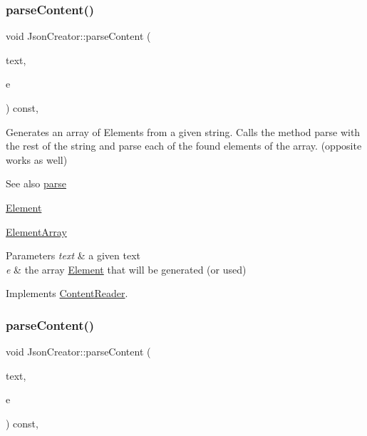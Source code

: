 \mbox{\label{classJsonCreator_a694669d359eb73890a9e9f247c4ebab4}} 
\subsubsection{\texorpdfstring{parse\+Content()}{parseContent()}\hspace{0.1cm}{\footnotesize\ttfamily [4/6]}}
{\footnotesize\ttfamily void Json\+Creator\+::parse\+Content (\begin{DoxyParamCaption}\item[{std\+::string \&}]{text,  }\item[{\mbox{\hyperlink{classElementArray}{Element\+Array}} $\ast$}]{e }\end{DoxyParamCaption}) const\hspace{0.3cm}{\ttfamily [override]}, {\ttfamily [virtual]}}

Generates an array of Elements from a given string. Calls the method parse with the rest of the string and parse each of the found elements of the array. (opposite works as well) \begin{DoxySeeAlso}{See also}
\mbox{\hyperlink{classJsonCreator_a505ff309c6b144d29478804b0e187c6f}{parse}} 

\mbox{\hyperlink{classElement}{Element}} 

\mbox{\hyperlink{classElementArray}{Element\+Array}}
\end{DoxySeeAlso}

\begin{DoxyParams}{Parameters}
{\em text} & a given text \\
\hline
{\em e} & the array \mbox{\hyperlink{classElement}{Element}} that will be generated (or used) \\
\hline
\end{DoxyParams}


Implements \mbox{\hyperlink{classContentReader_a91fdd738983dcc7a246c3c163007dfa9}{Content\+Reader}}.

\mbox{\label{classJsonCreator_a9f57af1a7925074b8e3e4175f74c886a}} 
\subsubsection{\texorpdfstring{parse\+Content()}{parseContent()}\hspace{0.1cm}{\footnotesize\ttfamily [5/6]}}
{\footnotesize\ttfamily void Json\+Creator\+::parse\+Content (\begin{DoxyParamCaption}\item[{std\+::string \&}]{text,  }\item[{\mbox{\hyperlink{classElementObject}{Element\+Object}} $\ast$}]{e }\end{DoxyParamCaption}) const\hspace{0.3cm}{\ttfamily [override]}, {\ttfamily [virtual]}}


